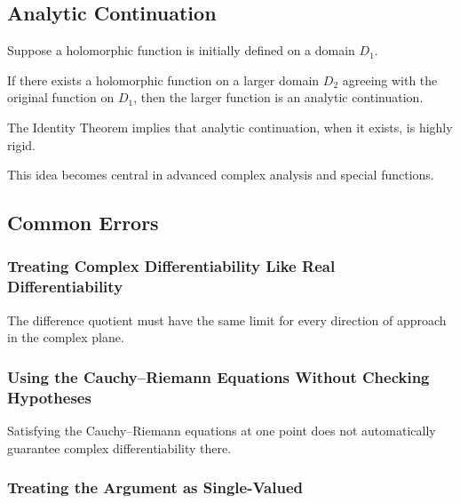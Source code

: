 \subsection{Analytic Continuation}
\label{subsec:analytic-continuation}

Suppose a holomorphic function is initially defined on a domain \(D_1\).

If there exists a holomorphic function on a larger domain \(D_2\) agreeing
with the original function on \(D_1\), then the larger function is an
analytic continuation.

The Identity Theorem implies that analytic continuation, when it exists,
is highly rigid.

This idea becomes central in advanced complex analysis and special
functions.

\subsection{Common Errors}
\label{subsec:complex-analysis-common-errors}

\subsubsection{Treating Complex Differentiability Like Real Differentiability}

The difference quotient must have the same limit for every direction of
approach in the complex plane.

\subsubsection{Using the Cauchy--Riemann Equations Without Checking Hypotheses}

Satisfying the Cauchy--Riemann equations at one point does not
automatically guarantee complex differentiability there.

\subsubsection{Treating the Argument as Single-Valued}

